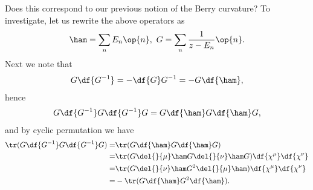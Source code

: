Does this correspond to our previous notion of the Berry curvature? To investigate, let us rewrite the above operators as
\begin{align*}
	\ham = \sum\limits_{n}E_{n}\op{n},\ G = \sum\limits_{n}\frac{1}{z - E_{n}}\op{n}.
\end{align*}
Next we note that
\begin{align*}
	G\df{G^{-1}} = -\df{G}G^{-1} = -G\df{\ham},
\end{align*}
hence
\begin{align*}
	G\df{G^{-1}}G\df{G^{-1}}G = G\df{\ham}G\df{\ham}G,
\end{align*}
and by cyclic permutation we have
\begin{align*}
	\tr(G\df{G^{-1}}G\df{G^{-1}}G) =& \tr(G\df{\ham}G\df{\ham}G) \\
	=& \tr(G\del{}{\mu}\ham G\del{}{\nu}\ham G)\df{\chi^{\mu}}\df{\chi^{\nu}} \\
	=& \tr(G\del{}{\nu}\ham G^{2}\del{}{\mu}\ham)\df{\chi^{\mu}}\df{\chi^{\nu}} \\
	=& -\tr(G\df{\ham}G^{2}\df{\ham}).
\end{align*}

